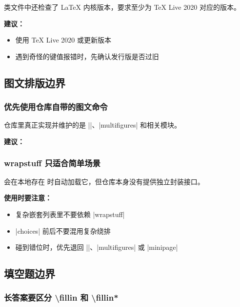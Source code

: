 类文件中还检查了 \LaTeX{} 内核版本，要求至少为 \TeX{} Live 2020 对应的版本。

\textbf{建议：}
\begin{itemize}
  \item 使用 \TeX{} Live 2020 或更新版本
  \item 遇到奇怪的键值报错时，先确认发行版是否过旧
\end{itemize}


\subsection{图文排版边界}

\subsubsection{优先使用仓库自带的图文命令}

仓库里真正实现并维护的是 |\textfigure|、|multifigures| 和相关模块。

\textbf{建议：}

\subsubsection{wrapstuff 只适合简单场景}

 会在本地存在  时自动加载它，但仓库本身没有提供独立封装接口。

\textbf{使用时要注意：}
\begin{itemize}
  \item 复杂嵌套列表里不要依赖 |wrapstuff|
  \item |choices| 前后不要混用复杂绕排
  \item 碰到错位时，优先退回 |\textfigure|、|multifigures| 或 |minipage|
\end{itemize}


\subsection{填空题边界}

\subsubsection{长答案要区分 \textbackslash fillin 和 \textbackslash fillin*}

